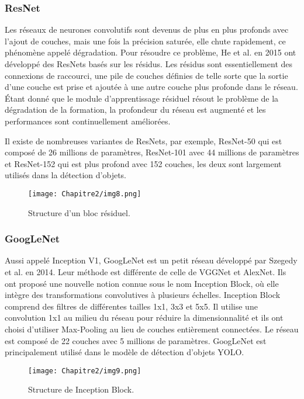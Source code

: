           \subsubsection{ResNet} \cite{res_paper}
          Les réseaux de neurones convolutifs sont devenus de plus en plus profonds avec l'ajout de couches, mais une fois la précision saturée, elle chute rapidement, ce phénomène appelé dégradation. Pour résoudre ce problème, He et al. en 2015 ont développé des ResNets basés sur les résidus. Les résidus sont essentiellement des connexions de raccourci, une pile de couches définies de telle sorte que la sortie d'une couche est prise et ajoutée à une autre couche plus profonde dans le réseau. Étant donné que le module d'apprentissage résiduel résout le problème de la dégradation de la formation, la profondeur du réseau est augmenté et les performances sont continuellement améliorées.

          Il existe de nombreuses variantes de ResNets, par exemple, ResNet-50 qui est composé de 26 millions de paramètres, ResNet-101 avec 44 millions de paramètres et ResNet-152 qui est plus profond avec 152 couches, les deux sont largement utilisés dans la détection d'objets.
          \begin{figure}[H]
               \centering
               \texttt{[image: Chapitre2/img8.png]}
               \caption{Structure d'un bloc résiduel.}
               \label{img8}
               \end{figure}
          
          \subsubsection{GoogLeNet} \cite{googlenet_paper}
          Aussi appelé Inception V1, GoogLeNet est un petit réseau développé par Szegedy et al. en 2014. Leur méthode est différente de celle de VGGNet et AlexNet. Ils ont proposé une nouvelle notion connue sous le nom Inception Block, où elle intègre des transformations convolutives à plusieurs échelles. Inception Block comprend des filtres de différentes tailles 1x1, 3x3 et 5x5. Il utilise une convolution 1x1 au milieu du réseau pour réduire la dimensionnalité et ils ont choisi d'utiliser Max-Pooling au lieu de couches entièrement connectées. Le réseau est composé de 22 couches avec 5 millions de paramètres. GoogLeNet est principalement utilisé dans le modèle de détection d'objets YOLO.
          \begin{figure}[H]
               \centering
               \texttt{[image: Chapitre2/img9.png]}
               \caption{Structure de Inception Block.}
               \label{img9}
               \end{figure}

